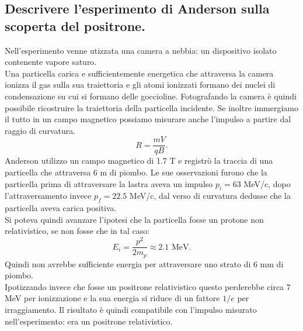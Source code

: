 \subsection[]{Descrivere l’esperimento di Anderson sulla scoperta del positrone.
}\label{sec:4.a.34}
Nell'esperimento venne utizzata una camera a nebbia: un dispositivo isolato contenente vapore saturo. \\ 
Una particella carica e sufficientemente energetica che attraversa la camera ionizza il gas sulla sua traiettoria e gli atomi ionizzati formano dei nuclei di condensazione su cui si formano delle goccioline. Fotografando la camera è quindi possibile ricostruire la traiettoria della particella incidente. Se inoltre immergiamo il tutto in un campo magnetico possiamo misurare anche l'impulso a partire dal raggio di curvatura.
\[
	R = \frac{mV}{qB}
.\] 
Anderson utilizzo un campo magnetico di 1.7 T e registrò la traccia di una particella che attraversa 6 m di piombo. Le sue osservazioni furono che la particella prima di attraversare la lastra aveva un impulso $p_{i}=63$ MeV/c, dopo l'attraversamento invece $p_{f}=22.5$ MeV/c, dal verso di curvatura dedusse che la particella aveva carica positiva.\\
Si poteva quindi avanzare l'ipotesi che la particella fosse un protone non relativistico, se non fosse che in tal caso:
\[
	E_{i}= \frac{p^2}{2m_{p}}\approx 2.1 \text{ MeV}
.\] 
Quindi non avrebbe sufficiente energia per attraversare uno strato di 6 mm di piombo.\\
Ipotizzando invece che fosse un positrone relativistico questo perderebbe circa 7 MeV per ionizzazione e la sua energia si riduce di un fattore $1 /e$ per irraggiamento. Il risultato è quindi compatibile con l'impulso misurato nell'esperimento: era un positrone relativistico.

